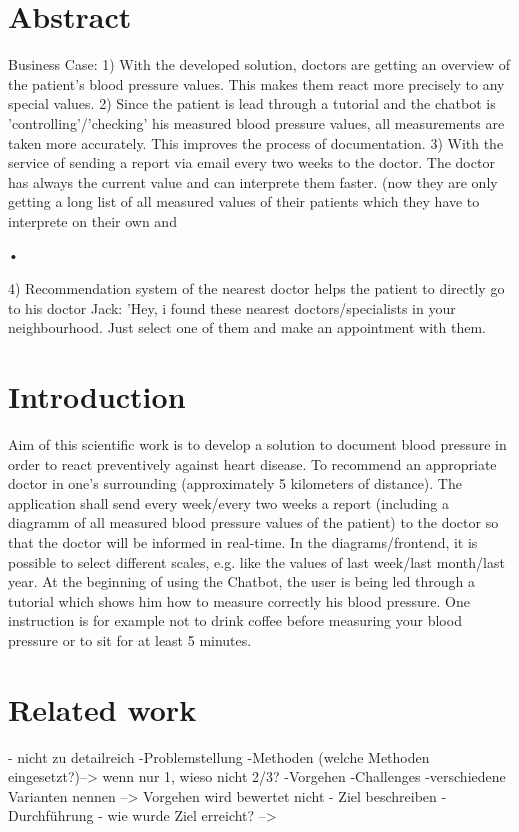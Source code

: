 




\chapter{Abstract}\label{abstract}

Business Case:
1) With the developed solution, doctors are getting an overview of the patient's blood pressure values. This makes them react more precisely to any special values. 
2) Since the patient is lead through a tutorial and the chatbot is 'controlling'/'checking' his measured blood pressure values, all measurements are taken more accurately. This improves the process of documentation.
3) With the service of sending a report via email every two weeks to the doctor. The doctor has always the current value and can interprete them faster. (now they are only getting a long list of all measured values of their patients which they have to interprete on their own and \begin{flushleft}
•
\end{flushleft}
4) Recommendation system of the nearest doctor helps the patient to directly go to his doctor 
Jack: 'Hey, i found these nearest doctors/specialists in your neighbourhood. Just select one of them and make an appointment with them. 

\chapter{Introduction}\label{introduction}

Aim of this scientific work is to develop a solution to document blood pressure in order to react preventively against heart disease.
To recommend an appropriate doctor in one's surrounding (approximately 5 kilometers of distance).
The application shall send every week/every two weeks a report (including a diagramm of all measured blood pressure values of the patient) to the doctor so that the doctor will be informed in real-time. In the diagrams/frontend, it is possible to select different scales, e.g. like the values of last week/last month/last year. 
At the beginning of using the Chatbot, the user is being led through a tutorial which shows him how to measure correctly his blood pressure. One instruction is for example not to drink coffee before measuring your blood pressure or to sit for at least 5 minutes.

\chapter{Related work}\label{related}
- nicht zu detailreich
-Problemstellung
-Methoden (welche Methoden eingesetzt?)--> wenn nur 1, wieso nicht 2/3?
-Vorgehen
-Challenges
-verschiedene Varianten nennen
--> Vorgehen wird bewertet nicht 
- Ziel beschreiben
- Durchführung
- wie wurde Ziel erreicht? --> 

